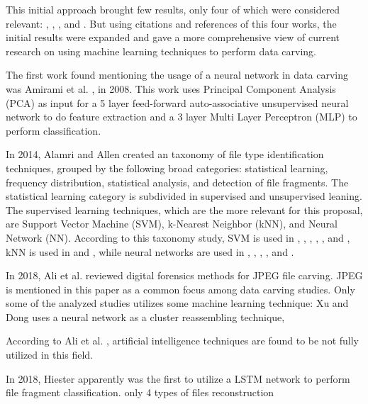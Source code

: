 This initial approach brought few results, only four of which were considered relevant: \cite{alamri_taxonomy_2014}, 
\cite{ali_review_2018}, \cite{sportiello_context-based_2012}, and \cite{beebe_sceadan:_2013}. But using citations and references of this four works, the initial results were expanded and gave a more comprehensive view of current research on using machine learning techniques to perform data carving.

The first work found mentioning the usage of a neural network in data carving was Amirami et al.  \cite{amirani_new_2008}, in 2008. This work uses Principal Component Analysis (PCA) as input for a 5 layer feed-forward auto-associative unsupervised neural network to do feature extraction and a 3 layer Multi Layer Perceptron (MLP) to perform classification.

In 2014, Alamri and Allen \cite{alamri_taxonomy_2014} created an taxonomy of file type identification techniques, grouped by the following broad categories: statistical learning, frequency distribution, statistical analysis, and detection of file fragments. The statistical learning category is subdivided in supervised and unsupervised leaning. The supervised learning techniques, which are the more relevant for this proposal, are Support Vector Machine (SVM), k-Nearest Neighbor (kNN), and Neural Network (NN). According to this taxonomy study, SVM is used in \cite{ahmed_fast_2011}, \cite{amirani_feature-based_2013}, \cite{beebe_sceadan:_2013}, \cite{fitzgerald_using_2012}, \cite{gopal_statistical_2011}, and \cite{sportiello_context-based_2012}, kNN is used in \cite{ahmed_fast_2011} and \cite{gopal_statistical_2011}, while neural networks are used in \cite{ahmed_fast_2011}, \cite{ahmed_content-based_2010}, \cite{amirani_new_2008}, \cite{amirani_feature-based_2013}, and \cite{penrose_approaches_2013}.

In 2018, Ali et al. \cite{ali_review_2018} reviewed digital forensics methods for JPEG file carving. JPEG is mentioned in this paper as a common focus among data carving studies. Only some of the analyzed studies utilizes some machine learning technique: Xu and Dong \cite{xu_reassembling_2009} uses a neural network as a cluster reassembling technique, 



According to Ali et al. \cite{ali_review_2018}, artificial intelligence techniques are found to be not fully utilized in this field.

In 2018, Hiester \cite{hiester_file_2018} apparently was the first to utilize a LSTM network to perform file fragment classification.
only 4 types of files
reconstruction

